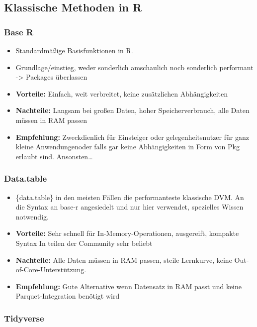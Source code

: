 \documentclass[
  german,
  10pt,
  twoside]{article}
\providecommand{\tightlist}{%
  \setlength{\itemsep}{0pt}\setlength{\parskip}{0pt}}
\begin{document}
\subsection{Klassische Methoden in R}\label{klassische-methoden-in-r}

\subsubsection{Base R}\label{base-r}

\begin{itemize}
\tightlist
\item
  Standardmäßige Basisfunktionen in R.
\item
  Grundlage/einstieg, weder sonderlich amschaulich nocb sonderlich
  performant -\textgreater{} Packages überlassen
\item
  \textbf{Vorteile:} Einfach, weit verbreitet, keine zusätzlichen
  Abhängigkeiten
\item
  \textbf{Nachteile:} Langsam bei großen Daten, hoher Speicherverbrauch,
  alle Daten müssen in RAM passen
\item
  \textbf{Empfehlung:} Zweckdienlich für Einsteiger oder
  gelegenheitsnutzer für ganz kleine Anwendungenoder falls gar keine
  Abhängigkeiten in Form von Pkg erlaubt sind. Ansonsten\ldots{}
\end{itemize}

\subsubsection{Data.table}\label{data.table}

\begin{itemize}
\tightlist
\item
  \{data.table\} in den meisten Fällen die performanteste klassische
  DVM. An die Syntax an base-r angesiedelt und nur hier verwendet,
  spezielles Wissen notwendig.
\item
  \textbf{Vorteile:} Sehr schnell für In-Memory-Operationen, ausgereift,
  kompakte Syntax In teilen der Community sehr beliebt
\item
  \textbf{Nachteile:} Alle Daten müssen in RAM passen, steile Lernkurve,
  keine Out-of-Core-Unterstützung.
\item
  \textbf{Empfehlung:} Gute Alternative wenn Datensatz in RAM passt und
  keine Parquet-Integration benötigt wird
\end{itemize}

\subsubsection{Tidyverse}\label{tidyverse}
\end{document}
